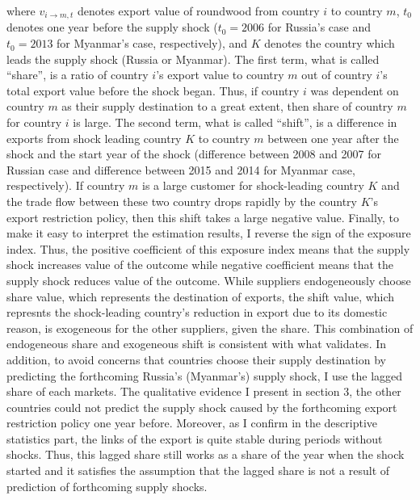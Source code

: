 \documentclass[a4paper,12pt]{article}
\begin{document}
where $v_{i \to m, t}$ denotes export value of roundwood from country $i$ to country $m$, $t_0$ denotes one year before the supply shock ($t_0 = 2006$ for Russia's case and $t_0 = 2013$ for Myanmar's case, respectively), and $K$ denotes the country which leads the supply shock (Russia or Myanmar). The first term, what is called ``share'', is a ratio of country $i$'s export value to country $m$ out of country $i$'s total export value before the shock began. Thus, if country $i$ was dependent on country $m$ as their supply destination to a great extent, then share of country $m$ for country $i$ is large. The second term, what is called ``shift'', is a difference in exports from shock leading country $K$ to country $m$ between one year after the shock and the start year of the shock (difference between 2008 and 2007 for Russian case and difference between 2015 and 2014 for Myanmar case, respectively). If country $m$ is a large customer for shock-leading country $K$ and the trade flow between these two country drops rapidly by the country $K$'s export restriction policy, then this shift takes a large negative value. Finally, to make it easy to interpret the estimation results, I reverse the sign of the exposure index. Thus, the positive coefficient of this exposure index means that the supply shock increases value of the outcome while negative coefficient means that the supply shock reduces value of the outcome. While suppliers endogeneously choose share value, which represents the destination of exports, the shift value, which represnts the shock-leading country's reduction in export due to its domestic reason, is exogeneous for the other suppliers, given the share. This combination of endogeneous share and exogeneous shift is consistent with what \cite{adao2019shift} validates. In addition, to avoid concerns that countries choose their supply destination by predicting the forthcoming Russia's (Myanmar's) supply shock, I use the lagged share of each markets. The qualitative evidence I present in section 3, the other countries could not predict the supply shock caused by the forthcoming export restriction policy one year before. Moreover, as I confirm in the descriptive statistics part, the links of the export is quite stable during periods without shocks. Thus, this lagged share still works as a share of the year when the shock started and it satisfies the assumption that the lagged share is not a result of prediction of forthcoming supply shocks.\\
\end{document}
